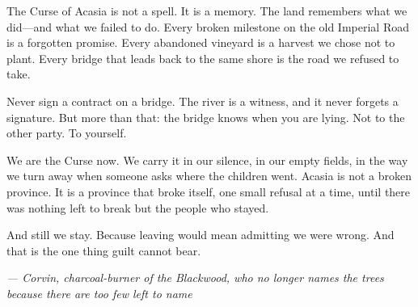 {\vspace{0.5em}

The Curse of Acasia is not a spell. It is a memory. The land remembers what we did---and what we failed to do. Every broken milestone on the old Imperial Road is a forgotten promise. Every abandoned vineyard is a harvest we chose not to plant. Every bridge that leads back to the same shore is the road we refused to take.

\vspace{0.5em}

Never sign a contract on a bridge. The river is a witness, and it never forgets a signature. But more than that: the bridge knows when you are lying. Not to the other party. To yourself.

\vspace{0.5em}

We are the Curse now. We carry it in our silence, in our empty fields, in the way we turn away when someone asks where the children went. Acasia is not a broken province. It is a province that broke itself, one small refusal at a time, until there was nothing left to break but the people who stayed.

\vspace{0.5em}

And still we stay. Because leaving would mean admitting we were wrong. And that is the one thing guilt cannot bear.

\vspace{1em}

\noindent\textit{--- Corvin, charcoal-burner of the Blackwood, who no longer names the trees because there are too few left to name}
}

\vspace{1em}

